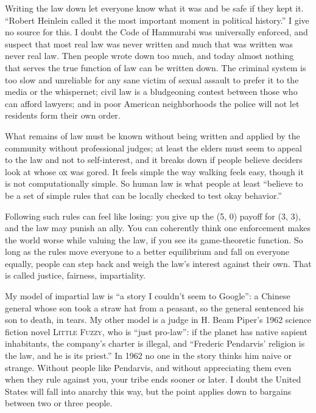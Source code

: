 Writing the law down let everyone know what it was and be safe if they kept it. ``Robert Heinlein called it the most important moment in political history.'' I give no source for this. I doubt the Code of Hammurabi was universally enforced, and suspect that most real law was never written and much that was written was never real law. Then people wrote down too much, and today almost nothing that serves the true function of law can be written down. The criminal system is too slow and unreliable for any sane victim of sexual assault to prefer it to the media or the whispernet; civil law is a bludgeoning contest between those who can afford lawyers; and in poor American neighborhoods the police will not let residents form their own order.

What remains of law must be known without being written and applied by the community without professional judges; at least the elders must seem to appeal to the law and not to self-interest, and it breaks down if people believe deciders look at whose ox was gored. It feels simple the way walking feels easy, though it is not computationally simple. So human law is what people at least ``believe to be a set of simple rules that can be locally checked to test okay behavior.'' 

Following such rules can feel like losing: you give up the (5, 0) payoff for (3, 3), and the law may punish an ally. You can coherently think one enforcement makes the world worse while valuing the law, if you see its game-theoretic function. So long as the rules move everyone to a better equilibrium and fall on everyone equally, people can step back and weigh the law's interest against their own. That is called justice, fairness, impartiality.

My model of impartial law is ``a story I couldn't seem to Google'': a Chinese general whose son took a straw hat from a peasant, so the general sentenced his son to death, in tears.  My other model is a judge in H. Beam Piper's 1962 science fiction novel \textsc{Little Fuzzy}, who is ``just pro-law'': if the planet has native sapient inhabitants, the company's charter is illegal, and ``Frederic Pendarvis' religion is the law, and he is its priest.'' In 1962 no one in the story thinks him naive or strange. Without people like Pendarvis, and without appreciating them even when they rule against you, your tribe ends sooner or later. I doubt the United States will fall into anarchy this way, but the point applies down to bargains between two or three people.

